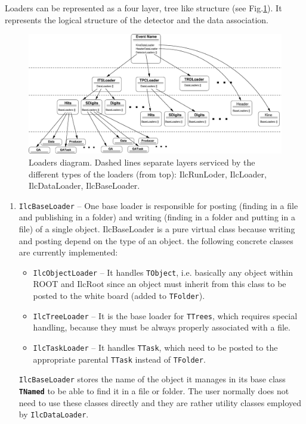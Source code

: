 \documentclass[12pt,a4paper,twoside]{article}
\newcommand{\class}[1]{\texttt{\textbf{#1}}\xspace}
\begin{document}
{Loaders can be represented as a four layer, tree like structure
(see Fig.\ref{cap:soft:loaderdiagram}). It represents the logical structure of
the detector and the data association.
% 
\begin{figure}
  \begin{center}
    \includegraphics[width=1.0\columnwidth, origin=c]{picts/loaderdiagram}
  \end{center}
  \caption
  {Loaders diagram. Dashed lines separate layers serviced by  the different types of
    the loaders (from top): IlcRunLoder, IlcLoader, IlcDataLoader, IlcBaseLoader.
    \label{cap:soft:loaderdiagram}}
\end{figure}


\begin{enumerate}

\item \texttt{IlcBaseLoader} -- One base loader is responsible for posting 
  (finding in a file and publishing in a folder) and writing 
  (finding in a folder and putting in a file) of a single object. 
  IlcBaseLoader is a pure virtual class because writing and 
  posting depend on the type of an object. the following concrete classes are currently implemented:
  \begin{itemize}
  \item \texttt{IlcObjectLoader} -- It handles \texttt{TObject}, i.e. basically any object 
    within ROOT and IlcRoot since an object must inherit from 
    this class to be posted to the white board 
    (added to \texttt{TFolder}).

  \item \texttt{IlcTreeLoader}   -- It is the base loader for \texttt{TTrees}, 
    which requires special
    handling, because they must be always properly 
    associated with a file.

  \item \texttt{IlcTaskLoader}  -- It handles \texttt{TTask}, which need to be posted to the 
    appropriate parental \texttt{TTask} instead of \texttt{TFolder}.
  \end{itemize}
  \texttt{IlcBaseLoader} stores the name of the object it manages in
  its base class \class{TNamed} to be able
  to find it in a file or folder. The user normally does not need to use
  these classes directly and they are rather utility classes employed by
  \texttt{IlcDataLoader}.


\end{enumerate}}
\end{document}
